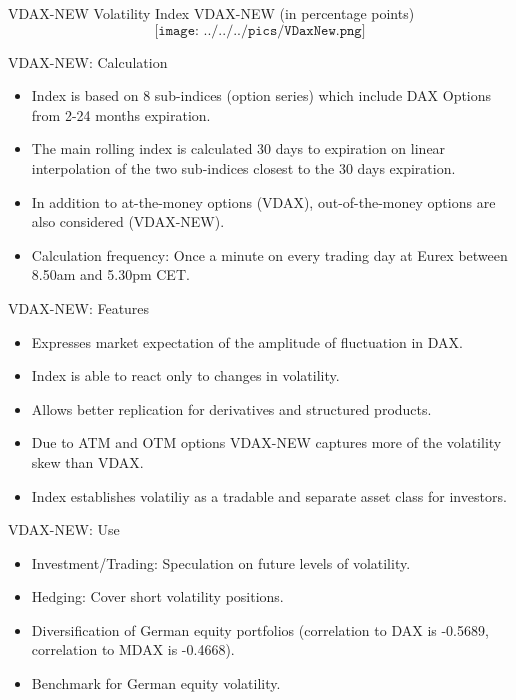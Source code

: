 {VDAX-NEW}
Volatility Index VDAX-NEW (in percentage points)
$$\texttt{[image: ../../../pics/VDaxNew.png]}$$




{VDAX-NEW: Calculation}
\begin{itemize}
  \item <1-> Index is based on 8 sub-indices (option series) which include DAX Options from 2-24 months expiration.
  \item <2-> The main rolling index is calculated 30 days to expiration on linear interpolation of the two sub-indices closest to the 30 days expiration.
  \item <3-> In addition to at-the-money options (VDAX), out-of-the-money options are also considered (VDAX-NEW).
  \item <4-> Calculation frequency: Once a minute on every trading day at Eurex between 8.50am and 5.30pm CET.
\end{itemize}



{VDAX-NEW: Features}
\begin{itemize}
  \item <1-> Expresses market expectation of the amplitude of fluctuation in DAX.
  \item <2-> Index is able to react only to changes in volatility.
  \item <3-> Allows better replication for derivatives and structured products.
  \item <4-> Due to ATM and OTM options VDAX-NEW captures more of the volatility skew than VDAX.
  \item <5-> Index establishes volatiliy as a tradable and separate asset class for investors.
\end{itemize}



{VDAX-NEW: Use}
\begin{itemize}
  \item <1-> Investment/Trading: Speculation on future levels of volatility.
  \item <2-> Hedging: Cover short volatility positions.
  \item <3-> Diversification of German equity portfolios (correlation to DAX is -0.5689, correlation to MDAX is -0.4668).
  \item <4-> Benchmark for German equity volatility.
\end{itemize}



